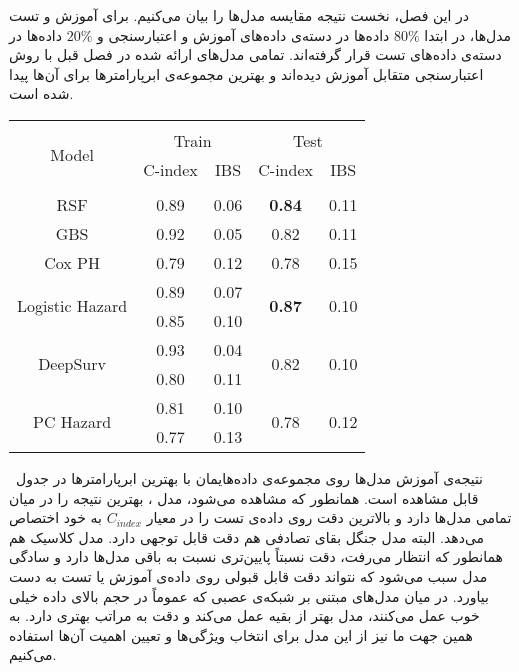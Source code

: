 
در این فصل، نخست نتیجه مقایسه مدل‌ها را بیان می‌کنیم. برای آموزش و تست مدل‌ها، در ابتدا 
$80\%$
داده‌ها در دسته‌ی داده‌های آموزش و اعتبارسنجی و
$20\%$
داده‌ها در دسته‌ی داده‌های تست قرار گرفته‌اند. تمامی مدل‌های ارائه شده در فصل قبل با روش اعتبارسنجی متقابل   آموزش دیده‌اند و بهترین مجموعه‌ی ابرپارامترها برای آن‌ها پیدا شده است.

\begin{table}[t]
	\begin{latin}
	\centering
	\begin{tabular}{|c|cc|cc|}
		\hline
		\\[-1em]
		\multirow{2}{*}{Model} & \multicolumn{2}{c|}{Train} & \multicolumn{2}{c|}{Test} \\
		& C-index & IBS & C-index & IBS \\
		\hline
		\\[-1em]
		RSF & 0.89 & 0.06 & \textbf{0.84} & 0.11 \\
		\hline
		GBS & 0.92 & 0.05 & 0.82 & 0.11 \\
		\hline
		Cox PH & 0.79 & 0.12 & 0.78 & 0.15 \\
		\hline
		\multirow{2}{*}{Logistic Hazard} & 0.89 & 0.07 & \multirow{2}{*}{\textbf{0.87}} & \multirow{2}{*}{0.10}\\
		& 0.85 & 0.10 & & \\
		\hline
		\multirow{2}{*}{DeepSurv} & 0.93 & 0.04 & \multirow{2}{*}{0.82} & \multirow{2}{*}{0.10}\\
		& 0.80 & 0.11 & & \\
		\hline
		\multirow{2}{*}{PC Hazard} & 0.81 & 0.10 & \multirow{2}{*}{0.78} & \multirow{2}{*}{0.12}\\
		& 0.77 & 0.13 & & \\
		\hline
		
	\end{tabular}
\end{latin}
\end{table}

نتیجه‌ی آموزش مدل‌ها روی مجموعه‌ی داده‌هایمان با بهترین ابرپارامترها در جدول~ قابل مشاهده است. همانطور که مشاهده می‌شود، مدل ، بهترین نتیجه را در میان تمامی مدل‌ها دارد و بالاترین دقت روی داده‌ی تست را در معیار $C_{index}$ به خود اختصاص می‌دهد. البته مدل جنگل بقای تصادفی هم دقت قابل توجهی دارد. مدل کلاسیک  هم همانطور که انتظار می‌رفت، دقت نسبتاً پایین‌تری نسبت به باقی مدل‌ها دارد و سادگی مدل سبب می‌شود که نتواند دقت قابل قبولی روی داده‌ی آموزش یا تست به دست بیاورد. در میان مدل‌های مبتنی بر شبکه‌ی عصبی که عموماً در حجم بالای داده خیلی خوب عمل می‌کنند، مدل  بهتر از بقیه عمل می‌کند و دقت به مراتب بهتری دارد. به همین جهت ما نیز از این مدل برای انتخاب ویژگی‌ها و تعیین اهمیت آن‌ها استفاده می‌کنیم.


